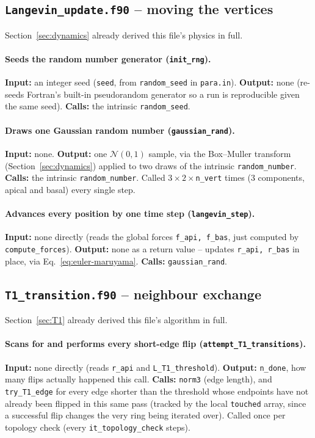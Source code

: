 \documentclass[11pt,a4paper]{report}
\begin{document}
\subsection{\texttt{Langevin\_update.f90} -- moving the vertices}
Section~\ref{sec:dynamics} already derived this file's physics in
full.
\paragraph{Seeds the random number generator (\texttt{init\_rng}).}
\textbf{Input:} an integer seed (\texttt{seed}, from
\texttt{random\_seed} in \texttt{para.in}). \textbf{Output:} none
(re-seeds Fortran's built-in pseudorandom generator so a run is
reproducible given the same seed). \textbf{Calls:} the intrinsic
\texttt{random\_seed}.
\paragraph{Draws one Gaussian random number (\texttt{gaussian\_rand}).}
\textbf{Input:} none. \textbf{Output:} one $\mathcal N(0,1)$ sample, via
the Box--Muller transform (Section~\ref{sec:dynamics}) applied to two
draws of the intrinsic \texttt{random\_number}. \textbf{Calls:} the
intrinsic \texttt{random\_number}. Called $3\times2\times$\texttt{n\_vert}
times (3 components, apical and basal) every single step.
\paragraph{Advances every position by one time step
(\texttt{langevin\_step}).} \textbf{Input:} none directly (reads the
global forces \texttt{f\_api, f\_bas}, just computed by
\texttt{compute\_forces}). \textbf{Output:} none as a return value --
updates \texttt{r\_api, r\_bas} in place, via
Eq.~\ref{eq:euler-maruyama}. \textbf{Calls:} \texttt{gaussian\_rand}.

\subsection{\texttt{T1\_transition.f90} -- neighbour exchange}
Section~\ref{sec:T1} already derived this file's algorithm in full.
\paragraph{Scans for and performs every short-edge flip
(\texttt{attempt\_T1\_transitions}).} \textbf{Input:} none directly
(reads \texttt{r\_api} and \texttt{L\_T1\_threshold}).
\textbf{Output:} \texttt{n\_done}, how many flips actually happened
this call. \textbf{Calls:} \texttt{norm3} (edge length), and
\texttt{try\_T1\_edge} for every edge shorter than the threshold whose
endpoints have not already been flipped in this same pass (tracked by
the local \texttt{touched} array, since a successful flip changes the
very ring being iterated over). Called once per topology check (every
\texttt{it\_topology\_check} steps).
\end{document}
